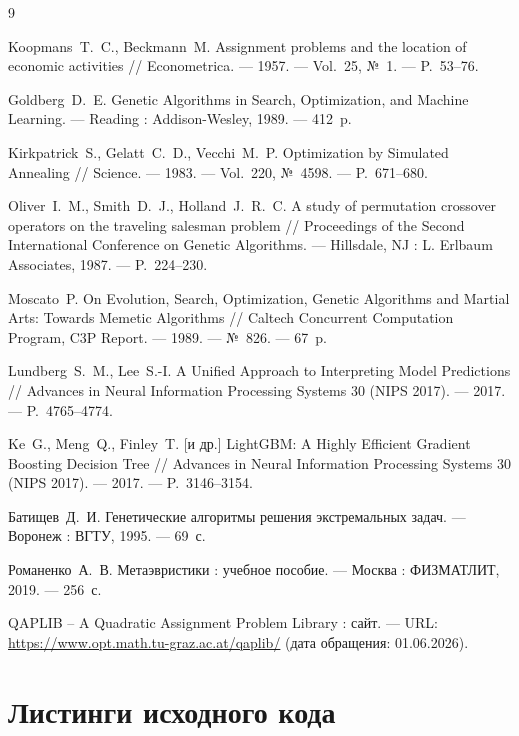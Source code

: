 \documentclass[732]{studrep}
\theoremstyle{nonumberplain}
\begin{document}
\begin{thebibliography}{9}

Koopmans~T.~C., Beckmann~M. Assignment problems and the location of economic
  activities // Econometrica. — 1957. — Vol.~25, №~1. — P.~53--76.

Goldberg~D.~E. Genetic Algorithms in Search, Optimization, and Machine
  Learning. — Reading : Addison-Wesley, 1989. — 412~p.

Kirkpatrick~S., Gelatt~C.~D., Vecchi~M.~P. Optimization by Simulated
  Annealing // Science. — 1983. — Vol.~220, №~4598. — P.~671--680.

Oliver~I.~M., Smith~D.~J., Holland~J.~R.~C. A study of permutation crossover
  operators on the traveling salesman problem // Proceedings of the Second
  International Conference on Genetic Algorithms. — Hillsdale, NJ : L. Erlbaum
  Associates, 1987. — P.~224--230.

Moscato~P. On Evolution, Search, Optimization, Genetic Algorithms and Martial
  Arts: Towards Memetic Algorithms // Caltech Concurrent Computation Program,
  C3P Report. — 1989. — №~826. — 67~p.

Lundberg~S.~M., Lee~S.-I. A Unified Approach to Interpreting Model
  Predictions // Advances in Neural Information Processing Systems 30 (NIPS
  2017). — 2017. — P.~4765--4774.

Ke~G., Meng~Q., Finley~T. [и др.] LightGBM: A Highly Efficient Gradient
  Boosting Decision Tree // Advances in Neural Information Processing Systems
  30 (NIPS 2017). — 2017. — P.~3146--3154.

Батищев~Д.~И. Генетические алгоритмы решения экстремальных задач. —
  Воронеж : ВГТУ, 1995. — 69~с.

Романенко~А.~В. Метаэвристики : учебное пособие. — Москва :
  ФИЗМАТЛИТ, 2019. — 256~с.

QAPLIB -- A Quadratic Assignment Problem Library : сайт. —
  URL: \url{https://www.opt.math.tu-graz.ac.at/qaplib/} (дата обращения:
  01.06.2026).

\end{thebibliography}

\appendices

\appendix

\chapter{Листинги исходного кода}
\label{app:code}
\end{document}
